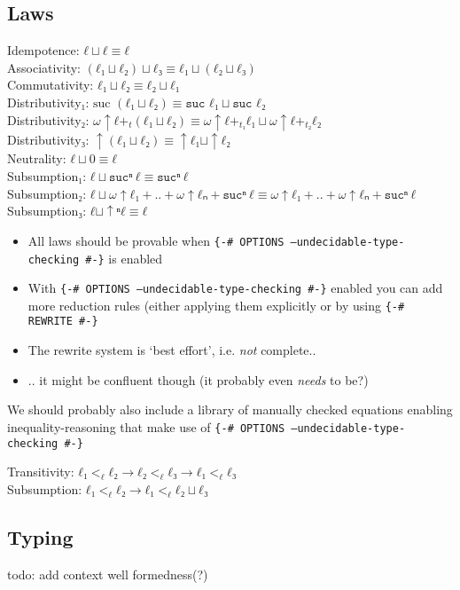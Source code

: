 \documentclass[runningheads,fleqn]{llncs}
\begin{document}
\subsection{Laws}
Idempotence: $ℓ ⊔ ℓ ≡ ℓ$ \\ 
Associativity: $(ℓ₁ ⊔ ℓ₂) ⊔ ℓ₃ ≡ ℓ₁ ⊔ (ℓ₂ ⊔ ℓ₃)$ \\
Commutativity: $ℓ₁ ⊔ ℓ₂ ≡ ℓ₂ ⊔ ℓ₁$ \\
Distributivity$₁$: $\text{suc } (ℓ₁ ⊔ ℓ₂) ≡ \texttt{suc } ℓ₁ ⊔ \texttt{suc } ℓ₂$ \\
Distributivity$₂$: $ω ↑ ℓ +_{t} (ℓ₁ ⊔ ℓ₂) ≡ ω ↑ ℓ +_{t₁} ℓ₁ ⊔ ω ↑ ℓ +_{t₂} ℓ₂$ \\
Distributivity$₃$: $↑ (ℓ₁ ⊔ ℓ₂) ≡ ↑ ℓ₁ ⊔ ↑ ℓ₂$ \\
Neutrality: $ℓ ⊔ 0 ≡ ℓ$ \\
Subsumption$₁$: $ℓ ⊔ \texttt{suc}ⁿ \ ℓ ≡ \texttt{suc}ⁿ \ ℓ$\\
Subsumption$₂$: $ℓ ⊔ ω ↑ ℓ₁ + .. + ω ↑ ℓₙ + \texttt{suc}ⁿ \ ℓ ≡ ω ↑ ℓ₁ + .. + ω ↑ ℓₙ + \texttt{suc}ⁿ \ ℓ$\\
Subsumption$₃$: $ℓ ⊔ ↑ⁿ ℓ ≡ ℓ$ 

\begin{itemize}
  \item All laws should be provable when \texttt{\{-\# OPTIONS --undecidable-type-checking \#-\}} is enabled
  \item With  \texttt{\{-\# OPTIONS --undecidable-type-checking \#-\}} enabled you can add more reduction rules (either applying them explicitly or by using \texttt{\{-\# REWRITE \#-\}} 
  \item The rewrite system is `best effort', i.e. \emph{not} complete..
  \item .. it might be confluent though (it probably even \emph{needs} to be?)
\end{itemize}

We should probably also include a library of manually checked equations enabling inequality-reasoning that make use of \texttt{\{-\# OPTIONS --undecidable-type-checking \#-\}}

\noindent Transitivity: $ℓ₁ <_ℓ ℓ₂ → ℓ₂ <_ℓ ℓ₃ → ℓ₁ <_ℓ ℓ₃$ \\ 
Subsumption: $ℓ₁ <_ℓ ℓ₂ → ℓ₁ <_ℓ ℓ₂ ⊔ ℓ₃$

\subsection{Typing}

\noindent todo: add context well formedness(?) 
\end{document}
